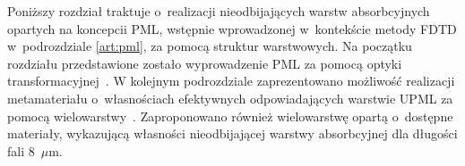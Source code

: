 Poniższy rozdział traktuje o~realizacji nieodbijających warstw absorbcyjnych opartych na koncepcii PML, wstępnie wprowadzonej w~kontekście metody FDTD w~podrozdziale \ref{art:pml}, za pomocą struktur warstwowych. Na początku rozdziału przedstawione zostało wyprowadzenie PML za pomocą optyki transformacyjnej~\cite{pendry2012transformation}. W kolejnym podrozdziale zaprezentowano możliwość realizacji metamateriału o~własnościach efektywnych odpowiadających warstwie UPML za pomocą wielowarstwy~\cite{ania2015}. Zaproponowano również wielowarstwę opartą o~dostępne materiały, wykazującą własności nieodbijającej warstwy absorbcyjnej dla długości fali $8$~$\mu$m.


